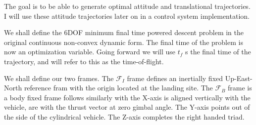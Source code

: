 The goal is to be able to generate optimal attitude and translational trajectories. I will use these attitude trajectories later on in a control system implementation.

We shall define the 6DOF minimum final time powered descent problem in the original continuous non-convex dynamic form. The final time of the problem is now an optimization variable. Going forward we will use $t_f$ s the final time of the trajectory, and will refer to this as the time-of-flight.

We shall define our two frames. The $\mathcal{F}_I$ frame defines an inertially fixed Up-East-North reference fram with the origin located at the landing site. The $\mathcal{F}_B$ frame is a body fixed frame follows similarly with the X-axis is aligned vertically with the vehicle, are with the thrust vector at zero gimbal angle. The Y-axis points out of the side of the cylindrical vehicle. The Z-axis completes the right handed triad.









